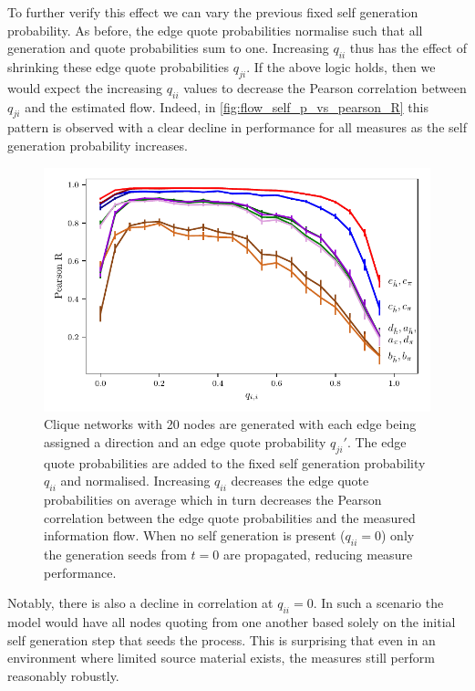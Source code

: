 To further verify this effect we can vary the previous fixed self generation probability. As before, the edge quote probabilities normalise such that all generation and quote probabilities sum to one. Increasing $q_{ii}$ thus has the effect of shrinking these edge quote probabilities $q_{ji}$. If the above logic holds, then we would expect the increasing $q_{ii}$ values to decrease the Pearson correlation between $q_{ji}$ and the estimated flow. Indeed, in \autoref{fig:flow_self_p_vs_pearson_R} this pattern is observed with a clear decline in performance for all measures as the self generation probability increases. 


\begin{figure}[!htbp]
	\centering
	\includegraphics{chapter3/figs/zipf_self_p.pdf}
	\caption{Clique networks with 20 nodes are generated with each edge being assigned a direction and an edge quote probability $q_{ji}'$. The edge quote probabilities are added to the fixed self generation probability $q_{ii}$ and normalised. Increasing $q_{ii}$ decreases the edge quote probabilities on average which in turn decreases the Pearson correlation between the edge quote probabilities and the measured information flow. When no self generation is present ($q_{ii}=0$) only the generation seeds from $t=0$ are propagated, reducing measure performance.}
	\label{fig:flow_self_p_vs_pearson_R}
\end{figure}

Notably, there is also a decline in correlation at $q_{ii}=0$. In such a scenario the model would have all nodes quoting from one another based solely on the initial self generation step that seeds the process. This is surprising that even in an environment where limited source material exists, the measures still perform reasonably robustly.

